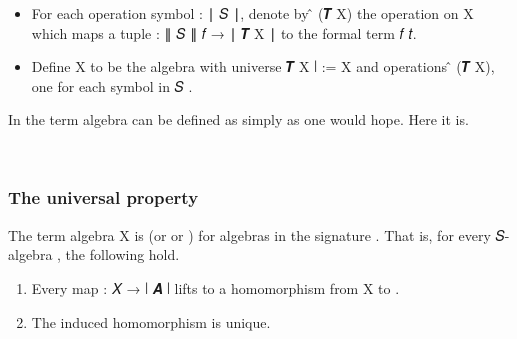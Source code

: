 \begin{itemize}
\item For each operation symbol  \as : \af ∣ \ab 𝑆 \af ∣, denote by    \af ̂ (\af 𝑻 \ab X) the operation on  \ab X which maps a  tuple  \as : \af ∥ \ab 𝑆 \af ∥ \ab 𝑓 \as → \af ∣ \af 𝑻 \ab X \af ∣ to the formal term \ab 𝑓 \ab 𝑡.
\item Define  \ab X to be the algebra with universe  \af 𝑻 \ab X \af ∣ :=  \ab X and operations  \af ̂ (\af 𝑻 \ab X), one for each symbol  in  \ab 𝑆 .
\end{itemize}

In \agda the term algebra can be defined as simply as one would hope.  Here it is.
\ccpad
\begin{code}%
\>[0]\AgdaSpace{}%
\AgdaSymbol{:}\AgdaSpace{}%
\AgdaSymbol{\{}\AgdaSpace{}%
\AgdaSymbol{:}\AgdaSpace{}%
\AgdaSymbol{\}(}\AgdaSpace{}%
\AgdaSymbol{:}\AgdaSpace{}%
\AgdaSpace{}%
\AgdaSpace{}%
\AgdaSymbol{)}\AgdaSpace{}%
\AgdaSpace{}%
\AgdaSpace{}%
\AgdaSymbol{(}\AgdaSpace{}%
\AgdaSymbol{)}\AgdaSpace{}%
\<%
\\
\>[0]\AgdaSpace{}%
\AgdaSpace{}%
\AgdaSymbol{=}\AgdaSpace{}%
\AgdaSpace{}%
\AgdaSpace{}%
\AgdaOperator{\AgdaInductiveConstructor{,}}\AgdaSpace{}%
\<%
\end{code}
\ccpad
\subsubsection{The universal property}\label{the-universal-property}

The term algebra  \ab X is  (or  or ) for algebras in the signature . That is, for every 𝑆-algebra , the following hold.

\begin{enumerate}
\item Every map  \as : \ab 𝑋 \as → \af ∣ \ab 𝑨 \af ∣ lifts to a homomorphism from   \ab X to .
\item The induced homomorphism is unique.
\end{enumerate}

